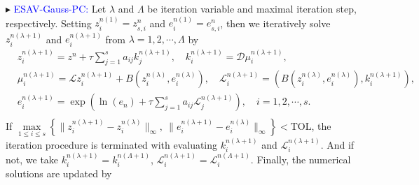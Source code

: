 \documentclass[10pt]{beamer}
\begin{document}
\begin{frame}
\textcolor[rgb]{0,0,1}{$\blacktriangleright$} \textcolor{blue}{ESAV-Gauss-PC:}
Let $\lambda$ and $\Lambda$ be iteration variable and maximal iteration step, respectively. Setting $z_i^{n(1)}=z_{s,i}^n$ and $e_i^{n(1)}=e_{s,i}^n$, then we iteratively solve $z_i^{n(\lambda+1)}$ and $e_i^{n(\lambda+1)}$ from $\lambda=1,2,\cdots,\Lambda$ by
\begin{equation}\label{eq-45}
\begin{aligned}
&z_i^{n(\lambda+1)}=z^n+\tau\sum_{j=1}^sa_{ij}k_j^{n(\lambda+1)},\quad k_i^{n(\lambda+1)}=\mathcal{D}\mu_i^{n(\lambda+1)},\\
&\mu_i^{n(\lambda+1)}=\mathcal{L}z_i^{n(\lambda+1)}+B\left(z_i^{n(\lambda)},e_i^{n(\lambda)}\right),\quad\mathcal{L}_i^{n(\lambda+1)}=\left(B\left(z_i^{n(\lambda)},e_i^{n(\lambda)}\right),k_i^{n(\lambda+1)}\right),\\
&e_i^{n(\lambda+1)}=\exp\left(\ln (e_n)+\tau\sum_{j=1}^sa_{ij}\mathcal{L}_j^{n(\lambda+1)}\right),\quad i=1,2,\cdots,s.\\
\end{aligned}
\end{equation}
If $\max\limits_{1\leq i\leq s}\left\{\|z_i^{n(\lambda+1)}-z_i^{n(\lambda)}\|_{\infty},~\|e_i^{n(\lambda+1)}-e_i^{n(\lambda)}\|_{\infty}\right\}<\mbox{TOL}$, the iteration procedure is terminated with evaluating $k_i^{n(\lambda+1)}$ and $\mathcal{L}_i^{n(\lambda+1)}$. And if not, we take $k_i^{n(\lambda+1)}=k_i^{n(\Lambda+1)}$, $\mathcal{L}_i^{n(\lambda+1)}=\mathcal{L}_i^{n(\Lambda+1)}$. Finally, the numerical solutions are updated by
\end{frame}
\end{document}

